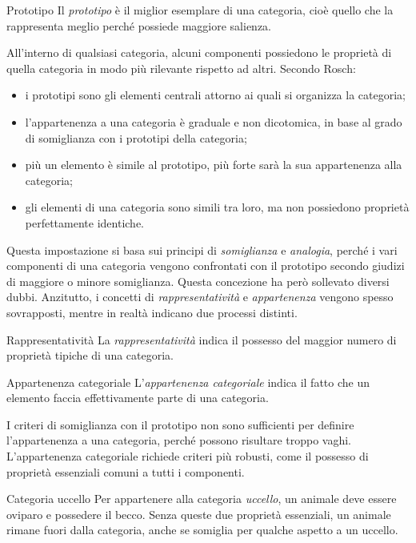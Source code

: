 \documentclass[a4paper]{article}
\begin{document}
\begin{snippetdefinition}{Prototipo}
    Il \emph{prototipo} è il miglior esemplare di una categoria, cioè quello che la rappresenta meglio perché possiede maggiore salienza.
\end{snippetdefinition}
All'interno di qualsiasi categoria, alcuni componenti possiedono le proprietà di quella categoria in modo più rilevante rispetto ad altri.
Secondo Rosch:
\begin{itemize}
    \item i prototipi sono gli elementi centrali attorno ai quali si organizza la categoria;
    \item l'appartenenza a una categoria è graduale e non dicotomica, in base al grado di somiglianza con i prototipi della categoria;
    \item più un elemento è simile al prototipo, più forte sarà la sua appartenenza alla categoria;
    \item gli elementi di una categoria sono simili tra loro, ma non possiedono proprietà perfettamente identiche.
\end{itemize}
Questa impostazione si basa sui principi di \emph{somiglianza} e \emph{analogia}, perché i vari componenti di una categoria vengono confrontati con il prototipo secondo giudizi di maggiore o minore somiglianza.
Questa concezione ha però sollevato diversi dubbi. Anzitutto, i concetti di \emph{rappresentatività} e \emph{appartenenza} vengono spesso sovrapposti, mentre in realtà indicano due processi distinti.
\begin{snippetdefinition}{Rappresentatività}
    La \emph{rappresentatività} indica il possesso del maggior numero di proprietà tipiche di una categoria.
\end{snippetdefinition}
\begin{snippetdefinition}{Appartenenza categoriale}
    L'\emph{appartenenza categoriale} indica il fatto che un elemento faccia effettivamente parte di una categoria.
\end{snippetdefinition}
I criteri di somiglianza con il prototipo non sono sufficienti per definire l'appartenenza a una categoria, perché possono risultare troppo vaghi. L'appartenenza categoriale richiede criteri più robusti, come il possesso di proprietà essenziali comuni a tutti i componenti.
\begin{snippetexample}{Categoria uccello}
    Per appartenere alla categoria \emph{uccello}, un animale deve essere oviparo e possedere il becco. Senza queste due proprietà essenziali, un animale rimane fuori dalla categoria, anche se somiglia per qualche aspetto a un uccello.
\end{snippetexample}
\end{document}
